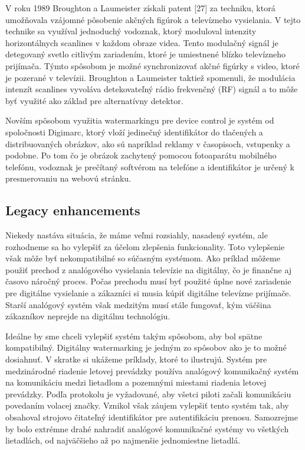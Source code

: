 V roku 1989 Broughton a Laumeister získali patent [27] za techniku, ktorá umožňovala vzájomné pôsobenie akčných figúrok a televízneho vysielania. V tejto technike sa využíval jednoduchý vodoznak, ktorý moduloval intenzity horizontálnych scanlines v každom obraze videa. Tento modulačný signál je detegovaný svetlo citlivým zariadením, ktoré je umiestnené blízko televízneho prijímača. Týmto spôsobom je možné synchronizovať akčné figúrky s video, ktoré je pozerané v televízii. Broughton a Laumeister taktiež spomenuli, že modulácia intenzít scanlines vyvoláva detekovateľný rádio frekvenčný (RF) signál a to môže byť využité ako základ pre alternatívny detektor.

Novším spôsobom využitia watermarkingu pre device control je systém od spoločnosti Digimarc, ktorý vloží jedinečný identifikátor do tlačených a distribuovaných obrázkov, ako sú napríklad reklamy v časopisoch, vstupenky a podobne. Po tom čo je obrázok zachytený pomocou fotoaparátu mobilného telefónu, vodoznak je prečítaný softvérom na telefóne a identifikátor je určený k presmerovaniu na webovú stránku. \cite{Cox}

\subsection{Legacy enhancements}
Niekedy nastáva situácia, že máme veľmi rozsiahly, nasadený systém, ale rozhodneme sa ho vylepšiť za účelom zlepšenia funkcionality. Toto vylepšenie však môže byť nekompatibilné so súčasným systémom. Ako príklad môžeme použiť prechod z analógového vysielania televízie na digitálny, čo je finančne aj časovo náročný proces. Počas prechodu musí byť použité úplne nové zariadenie pre digitálne vysielanie a zákazníci si musia kúpiť digitálne televízne prijímače. Starší analógový systém však medzitým musí stále fungovať, kým väčšina zákazníkov neprejde na digitálnu technológiu.

Ideálne by sme chceli vylepšiť systém takým spôsobom, aby bol spätne kompatibilný. Digitálny watermarking je jedným zo spôsobov ako je to možné dosiahnuť. V skratke si ukážeme príklady, ktoré to ilustrujú.
Systém pre medzinárodné riadenie letovej prevádzky používa analógový komunikačný systém na komunikáciu medzi lietadlom a pozemnými miestami riadenia letovej prevádzky. Podľa protokolu je vyžadované, aby všetci piloti začali komunikáciu povedaním volacej značky. Vznikol však záujem vylepšiť tento systém tak, aby obsahoval strojovo čitateľný identifikátor pre autentifikáciu prenosu. Samozrejme by bolo extrémne drahé nahradiť analógové komunikačné systémy vo všetkých lietadlách, od najväčšieho až po najmenšie jednomiestne lietadlá.

